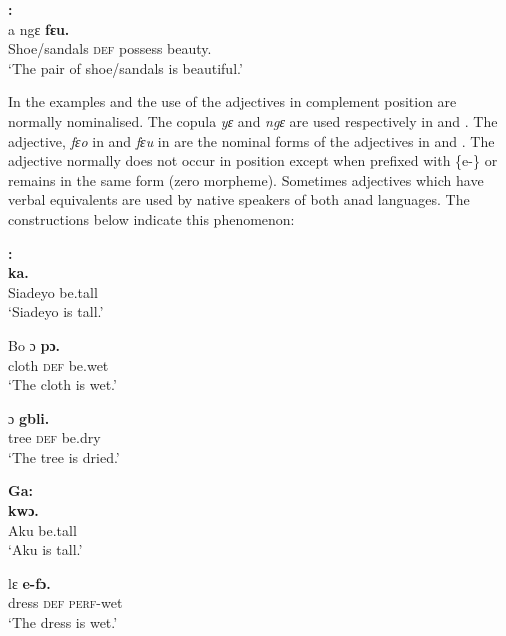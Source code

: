 \documentclass[output=paper,
modfonts
]{langscibook}
\begin{document}
\ea\label{ex:caesar:43}
\textbf{:} \\
 {a} {ngɛ} \textbf{{fɛu.}}\\
 Shoe/sandals \textsc{def} possess beauty.\\
\glt  ‘The pair of shoe/sandals is beautiful.’
\z




In the examples  and  the use of the adjectives in complement position are normally nominalised. The copula  \textit{yɛ} and \textit{ngɛ} are used respectively in  and . The adjective, \textit{fɛo} in  and \textit{fɛu} in  are the nominal forms of the adjectives in  and . The  adjective normally does not occur in  position except when prefixed with \{e-\} or remains in the same form (zero morpheme). Sometimes adjectives which have verbal equivalents are used by native speakers of both  anad  languages. The constructions below indicate this phenomenon:

\ea\label{ex:caesar:44}
\textbf{:}\\
 \textbf{{ka.}}\\
 Siadeyo be.tall\\
\glt ‘Siadeyo is tall.’
\z



\ea\label{ex:caesar:45}
\gll Bo ɔ \textbf{{pɔ.}}\\
cloth \textsc{def} be.wet\\
\glt ‘The cloth is wet.’
\z



\ea\label{ex:caesar:46}
\gll {} ɔ \textbf{{gbli.}}\\
 tree \textsc{def} be.dry\\
\glt ‘The tree is dried.’
\z



\ea\label{ex:caesar:47}
 \textbf{Ga:} \\
  \textbf{{kwɔ.}}\\
 Aku be.tall \\
\glt  ‘Aku is tall.’
\z



\ea\label{ex:caesar:48}
 {lɛ} \textbf{{e-fɔ.}}\\
 dress \textsc{def} \textsc{perf}-wet\\
\glt  ‘The dress is wet.’
\z
\end{document}
